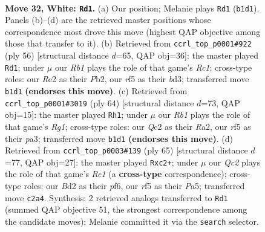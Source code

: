\documentclass[11pt]{article}
\begin{document}
\clearpage

\begin{figure}[p]\centering
\begin{subfigure}{0.46\textwidth}\centering
\resizebox{\linewidth}{!}{%
\newchessgame
\chessboard[
  setfen={r1bq3k/8/8/4pr1p/2p4P/p1P3P1/P1QBR3/1R4K1 w - - 6 32},
  showmover=false,
  pgfstyle=straightmove, color=movearrow, markmove={b1-d1}
]}
\caption{}
\end{subfigure}\hfill
\begin{subfigure}{0.46\textwidth}\centering
\resizebox{\linewidth}{!}{%
\newchessgame
\chessboard[
  setfen={3r2k1/5pp1/1pB1p3/4P2p/5PPq/3b1Q1P/PP6/2R3K1 w - - 2 29},
  showmover=false,
  pgfstyle=straightmove, color=movearrow, markmove={c1-d1}
]}
\caption{}
\end{subfigure}
\\[4pt]
\begin{subfigure}{0.46\textwidth}\centering
\resizebox{\linewidth}{!}{%
\newchessgame
\chessboard[
  setfen={2q1r2k/5ppp/8/3P2PP/1b3p2/p2Q4/R1P2P2/3K2R1 w - - 4 33},
  showmover=false,
  pgfstyle=straightmove, color=movearrow, markmove={g1-h1}
]}
\caption{}
\end{subfigure}\hfill
\begin{subfigure}{0.46\textwidth}\centering
\resizebox{\linewidth}{!}{%
\newchessgame
\chessboard[
  setfen={2rq2k1/5p1p/3p1P2/p2Pp1Pp/R7/1P3R2/2QK3P/8 b - - 0 33},
  showmover=false,
  pgfstyle=straightmove, color=movearrow, markmove={c8-c2}
]}
\caption{}
\end{subfigure}
\caption{\textbf{Move 32, White: \texttt{Rd1}.} (a) Our position; Melanie plays \texttt{Rd1} (\texttt{b1d1}). Panels (b)--(d) are the retrieved master positions whose correspondence most drove this move (highest QAP objective among those that transfer to it). (b) Retrieved from \texttt{ccrl\_top\_p0001\#922} (ply 56) [structural distance $d$=65, QAP obj=36]: the master played \texttt{Rd1}; under $\mu$ our \emph{Rb1} plays the role of that game's \emph{Rc1}; cross-type roles: our \emph{R}e2 as their \emph{P}b2, our \emph{r}f5 as their \emph{b}d3; transferred move \texttt{b1d1} \textbf{(endorses this move)}. (c) Retrieved from \texttt{ccrl\_top\_p0001\#3019} (ply 64) [structural distance $d$=73, QAP obj=15]: the master played \texttt{Rh1}; under $\mu$ our \emph{Rb1} plays the role of that game's \emph{Rg1}; cross-type roles: our \emph{Q}c2 as their \emph{R}a2, our \emph{r}f5 as their \emph{p}a3; transferred move \texttt{b1d1} \textbf{(endorses this move)}. (d) Retrieved from \texttt{ccrl\_top\_p0003\#139} (ply 65) [structural distance $d$=77, QAP obj=27]: the master played \texttt{Rxc2+}; under $\mu$ our \emph{Qc2} plays the role of that game's \emph{Rc1} (a \textbf{cross-type} correspondence); cross-type roles: our \emph{B}d2 as their \emph{p}f6, our \emph{r}f5 as their \emph{P}a5; transferred move \texttt{c2a4}. Synthesis: 2 retrieved analogs transferred to \texttt{Rd1} (summed QAP objective 51, the strongest correspondence among the candidate moves); Melanie committed it via the \texttt{search} selector.}
\label{fig:thought-m62}
\end{figure}
\end{document}
